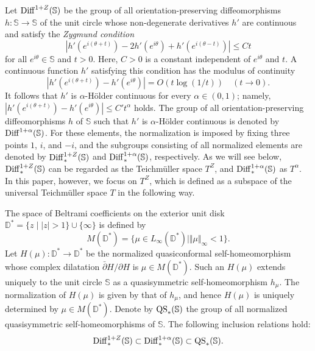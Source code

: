 \documentclass[amstex]{amsart}
\theoremstyle{definition}
\theoremstyle{remark}
\numberwithin{equation}{section}
\begin{document}
Let ${\rm Diff}^{1+Z}(\mathbb S)$ be the group of all orientation-preserving diffeomorphisms 
$h:\mathbb S \to \mathbb S$ of the unit circle whose non-degenerate derivatives $h'$ are continuous and satisfy the {\it Zygmund condition}
\begin{equation}\label{zy}
|h'(e^{i(\theta+t)}) - 2h'(e^{i\theta}) + h'(e^{i(\theta-t)})| \leq Ct
\end{equation}
for all $e^{i\theta} \in \mathbb S$ and $t > 0$. Here, $C>0$ is a constant independent of $e^{i\theta}$ and $t$.
A continuous function $h'$ satisfying this condition has the modulus of continuity
\begin{equation}\label{modulus}
|h'(e^{i(\theta+t)}) - h'(e^{i\theta})| = O(t\log(1/t)) \quad (t \to 0).
\end{equation}
It follows that $h'$ is $\alpha$-H\"older continuous for every $\alpha \in (0,1)$; namely,
$|h'(e^{i(\theta+t)}) -h'(e^{i\theta})| \leq C't^\alpha$ holds.
The group of all orientation-preserv\-ing diffeomorphisms 
$h$ of $\mathbb S$ such that $h'$ is $\alpha$-H\"older continuous is denoted by ${\rm Diff}^{1+\alpha}(\mathbb S)$.
For these elements, the normalization is imposed by fixing three points $1$, $i$, and $-i$,
and the subgroups consisting of all normalized elements are denoted by 
${\rm Diff}^{1+Z}_*(\mathbb S)$ and ${\rm Diff}^{1+\alpha}_*(\mathbb S)$, respectively.
As we will see below, ${\rm Diff}^{1+Z}_*(\mathbb S)$ can be regarded as 
the Teichm\"uller space $T^Z$, and ${\rm Diff}^{1+\alpha}_*(\mathbb S)$ as $T^\alpha$.
In this paper, however, we focus on $T^Z$, which is defined as a subspace of
the universal Teichm\"uller space $T$ in the following way.

The space of Beltrami coefficients on the exterior unit disk
$\mathbb D^* = \{z \mid {|z|>1}\} \cup \{\infty\}$ is defined by
$$
M(\mathbb D^*) = \{\mu \in L_\infty(\mathbb D^*) \mid \Vert \mu \Vert_\infty < 1\}.
$$
Let $H(\mu):\mathbb D^* \to \mathbb D^*$ be the normalized quasiconformal self-homeo\-mor\-phism 
whose complex dilatation $\bar \partial H/\partial H$ is $\mu \in M(\mathbb D^*)$.
Such an $H(\mu)$ extends uniquely to the unit circle $\mathbb S$ 
as a quasisymmetric self-homeomorphism $h_\mu$.
The normalization of $H(\mu)$ is given by that of $h_\mu$, and hence $H(\mu)$ is uniquely determined by $\mu \in M(\mathbb D^*)$.
Denote by ${\rm QS}_*(\mathbb S)$ the group of all normalized quasisymmetric self-homeomorphisms of $\mathbb S$.
The following inclusion relations hold: 
$$
{\rm Diff}^{1+Z}_*(\mathbb S) \subset {\rm Diff}^{1+\alpha}_*(\mathbb S) \subset {\rm QS}_*(\mathbb S).
$$
\end{document}
